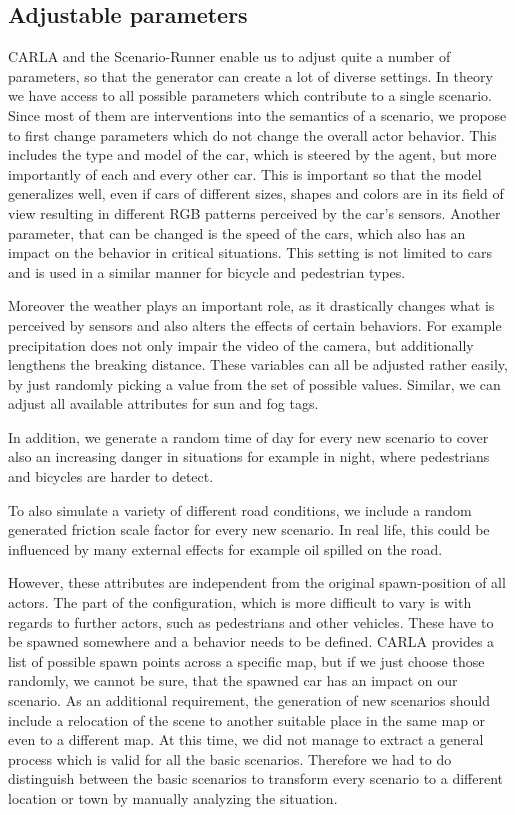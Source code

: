 \documentclass[conference, a4paper, 11pt]{IEEEtran}
\begin{document}
\subsection{Adjustable parameters}

CARLA and the Scenario-Runner enable us to adjust quite a number of parameters, so that the generator can create a lot of diverse settings. In theory we have access to all possible parameters which contribute to a single scenario. Since most of them are interventions into the semantics of a scenario, we propose to first change parameters which do not change the overall actor behavior.
This includes the type and model of the car, which is steered by the agent, but more importantly of each and every other car.
This is important so that the model generalizes well, even if cars of different sizes, shapes and colors are in its field of view resulting in different RGB patterns perceived by the car's sensors.
Another parameter, that can be changed is the speed of the cars, which also has an impact on the behavior in critical situations.
This setting is not limited to cars and is used in a similar manner for bicycle and pedestrian types.

Moreover the weather plays an important role, as it drastically changes what is perceived by sensors and also alters the effects of certain behaviors. For example precipitation does not only impair the video of the camera, but additionally lengthens the breaking distance.
These variables can all be adjusted rather easily, by just randomly picking a value from the set of possible values.
Similar, we can adjust all available attributes for sun and fog tags.

In addition, we generate a random time of day for every new scenario to cover also an increasing danger in situations for example in night, where pedestrians and bicycles are harder to detect.

To also simulate a variety of different road conditions, we include a random generated friction scale factor for every new scenario. In real life, this could be influenced by many external effects for example oil spilled on the road.

However, these attributes are independent from the original spawn-position of all actors. 
The part of the configuration, which is more difficult to vary is with regards to further actors, such as pedestrians and other vehicles. These have to be spawned somewhere and a behavior needs to be defined.
CARLA provides a list of possible spawn points across a specific map, but if we just choose those randomly, we cannot be sure, that the spawned car has an impact on our scenario.
As an additional requirement, the generation of new scenarios should include a relocation of the scene to another suitable place in the same map or even to a different map.
At this time, we did not manage to extract a general process which is valid for all the basic scenarios. Therefore we had to do distinguish between the basic scenarios to transform every scenario to a different location or town by manually analyzing the situation.
\end{document}
